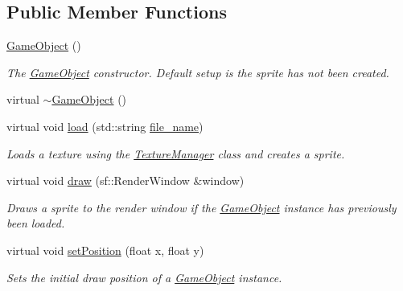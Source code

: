 \subsection*{Public Member Functions}
\begin{DoxyCompactItemize}
\item 
\hyperlink{class_game_object_a0348e3ee2e83d56eafca7a3547f432c4}{Game\+Object} ()
\begin{DoxyCompactList}\small\item\em The \hyperlink{class_game_object}{Game\+Object} constructor. Default setup is the sprite has not been created. \end{DoxyCompactList}\item 
virtual \hyperlink{class_game_object_a224d4f6d9dd75c8a6f9d022eaf586fd9}{$\sim$\+Game\+Object} ()
\item 
virtual void \hyperlink{class_game_object_acc593e5b75a58c4a59ad59da654ce807}{load} (std\+::string \hyperlink{class_game_object_a1b725daa9c79833a7139469468dc770a}{file\+\_\+name})
\begin{DoxyCompactList}\small\item\em Loads a texture using the \hyperlink{class_texture_manager}{Texture\+Manager} class and creates a sprite. \end{DoxyCompactList}\item 
virtual void \hyperlink{class_game_object_abf4de46e52c8f23d18d51bc29744b136}{draw} (sf\+::\+Render\+Window \&window)
\begin{DoxyCompactList}\small\item\em Draws a sprite to the render window if the \hyperlink{class_game_object}{Game\+Object} instance has previously been loaded. \end{DoxyCompactList}\item 
virtual void \hyperlink{class_game_object_a180d6e9e7afa44b30ca678a95c6f4dad}{set\+Position} (float x, float y)
\begin{DoxyCompactList}\small\item\em Sets the initial draw position of a \hyperlink{class_game_object}{Game\+Object} instance. \end{DoxyCompactList}\end{DoxyCompactItemize}
